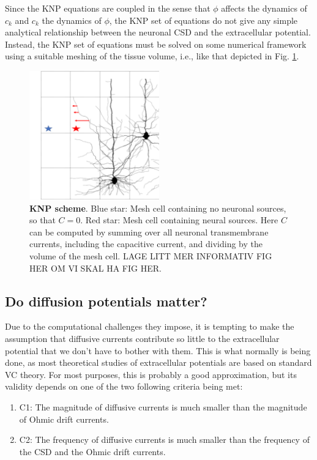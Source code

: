 Since the KNP equations are coupled in the sense that $\phi$ affects the dynamics of $c_k$ and $c_k$ the dynamics of $\phi$, the KNP set of equations do not give any simple analytical relationship between the neuronal CSD and the extracellular potential. Instead, the KNP set of equations must be solved on some numerical framework using a suitable meshing of the tissue volume, i.e., like that depicted in Fig. \ref{Eldiff:fig:KNPmesh}.

\begin{figure}[!ht]
\begin{center}
\includegraphics[width=0.5\textwidth]{Figures/Eldiff/KNP.png}
\end{center}
\caption{\textbf{KNP scheme}. Blue star: Mesh cell containing no neuronal sources, so that $C=0$. Red star: Mesh cell containing neural sources. Here $C$ can be computed by summing over all neuronal transmembrane currents, including the capacitive current, and dividing by the volume of the mesh cell. LAGE LITT MER INFORMATIV FIG HER OM VI SKAL HA FIG HER.}
\label{Eldiff:fig:KNPmesh}
\end{figure}


\subsection{Do diffusion potentials matter?}
Due to the computational challenges they impose, it is tempting to make the assumption that diffusive currents contribute so little to the extracellular potential that we don't have to bother with them. This is what normally is being done, as most theoretical studies of extracellular potentials are based on standard VC theory. For most purposes, this is probably a good approximation, but its validity depends on one of the two following criteria being met:

\begin{enumerate}
\item C1: The magnitude of diffusive currents is much smaller than the magnitude of Ohmic drift currents.
\item C2: The frequency of diffusive currents is much smaller than the frequency of the CSD and the Ohmic drift currents. 
\end{enumerate}

